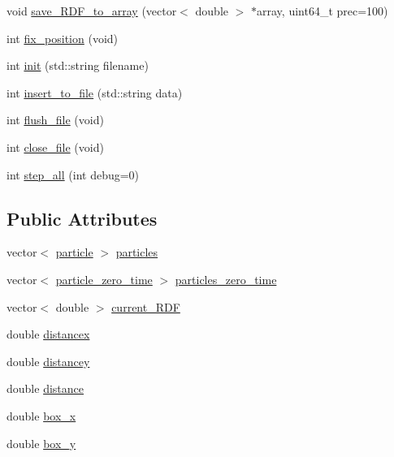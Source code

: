 \begin{DoxyCompactItemize}
void \mbox{\hyperlink{classClassSiec_a9c96b5d39e27f8f2bdda6fd60113ceb6}{save\+\_\+\+R\+D\+F\+\_\+to\+\_\+array}} (vector$<$ double $>$ $\ast$array, uint64\+\_\+t prec=100)
\item 
int \mbox{\hyperlink{classClassSiec_a4527492cd521a36e1bcad1cb38034784}{fix\+\_\+position}} (void)
\item 
int \mbox{\hyperlink{classClassSiec_a5c2c133544d66df25e8b13e6b710272e}{init}} (std\+::string filename)
\item 
int \mbox{\hyperlink{classClassSiec_ab49b9f6b28f5e3c319384f518042272a}{insert\+\_\+to\+\_\+file}} (std\+::string data)
\item 
int \mbox{\hyperlink{classClassSiec_aa6e0a35a8b5387e43ee4f518ee101d74}{flush\+\_\+file}} (void)
\item 
int \mbox{\hyperlink{classClassSiec_aa0f4586cbe65a86ba011772287a546a9}{close\+\_\+file}} (void)
\item 
int \mbox{\hyperlink{classClassSiec_a0de17762248441c53936ee7924776052}{step\+\_\+all}} (int debug=0)
\end{DoxyCompactItemize}
\subsection*{Public Attributes}
\begin{DoxyCompactItemize}
\item 
vector$<$ \mbox{\hyperlink{structparticle}{particle}} $>$ \mbox{\hyperlink{classClassSiec_aa1a11eee47b10c11930952f092110e94}{particles}}
\item 
vector$<$ \mbox{\hyperlink{structparticle__zero__time}{particle\+\_\+zero\+\_\+time}} $>$ \mbox{\hyperlink{classClassSiec_aa1096135e230dbae78ec05efc8a4725f}{particles\+\_\+zero\+\_\+time}}
\item 
vector$<$ double $>$ \mbox{\hyperlink{classClassSiec_aaa4641c3eb550d26c64a785729e8cd63}{current\+\_\+\+R\+DF}}
\item 
double \mbox{\hyperlink{classClassSiec_a98e9ee22a2e12ce6612d1ce6e785cda2}{distancex}}
\item 
double \mbox{\hyperlink{classClassSiec_a5c100f779c613f9c747b0b7a3f02f2d9}{distancey}}
\item 
double \mbox{\hyperlink{classClassSiec_a4593ac900fa92dd33f9b40010b35efb9}{distance}}
\item 
double \mbox{\hyperlink{classClassSiec_a8ebc9e2a0a8f7ccf4736482aa2a5f673}{box\+\_\+x}}
\item 
double \mbox{\hyperlink{classClassSiec_a51b98a4d58f22b84e410eaf2c7b31c4b}{box\+\_\+y}}
\end{DoxyCompactItemize}


